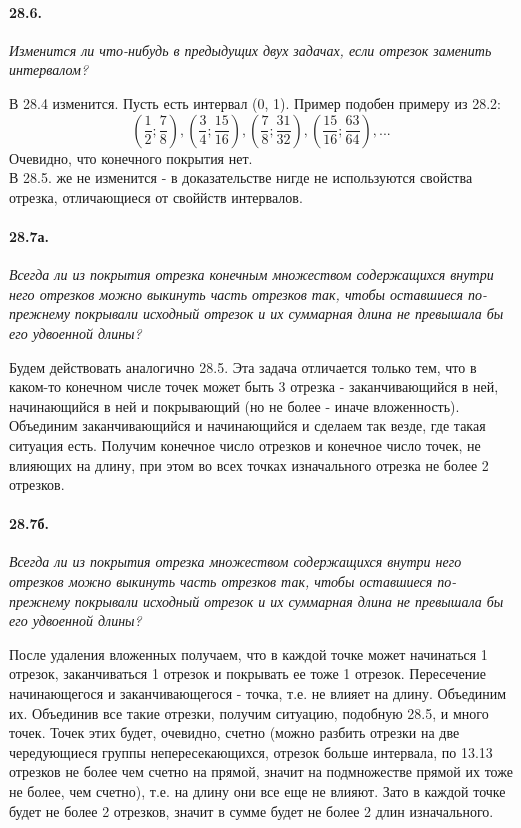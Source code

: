 \documentclass{book}
\begin{document}
\paragraph{28.6.}
\textit{Изменится ли что-нибудь в предыдущих двух задачах, если отрезок заменить
интервалом?}

В 28.4 изменится. Пусть есть интервал (0, 1). Пример подобен примеру из 28.2:
\[(\frac{1}{2}; \frac{7}{8}), (\frac{3}{4}; \frac{15}{16}), (\frac{7}{8}; \frac{31}{32}), (\frac{15}{16}; \frac{63}{64}) , ...\] Очевидно, что конечного покрытия нет. \\
В 28.5. же не изменится - в доказательстве нигде не используются свойства отрезка, отличающиеся от своййств интервалов.

\paragraph{28.7а.}
\textit{Всегда ли из покрытия отрезка конечным множеством содержащихся внутри него отрезков можно выкинуть часть отрезков так, чтобы оставшиеся по-прежнему покрывали исходный отрезок и их суммарная длина не превышала бы его удвоенной длины?}

Будем действовать аналогично 28.5. Эта задача отличается только тем, что в каком-то конечном числе точек может быть 3 отрезка - заканчивающийся в ней, начинающийся в ней и покрывающий (но не более - иначе вложенность). Объединим заканчивающийся и начинающийся и сделаем так везде, где такая ситуация есть. Получим конечное число отрезков и конечное число точек, не влияющих на длину, при этом во всех точках изначального отрезка не более 2 отрезков. 

\paragraph{28.7б.}
\textit{Всегда ли из покрытия отрезка множеством содержащихся внутри него отрезков можно выкинуть часть отрезков так, чтобы оставшиеся по-прежнему покрывали исходный отрезок и их суммарная длина не превышала бы его удвоенной длины?}

После удаления вложенных получаем, что в каждой точке может начинаться 1 отрезок, заканчиваться 1 отрезок и покрывать ее тоже 1 отрезок. Пересечение начинающегося и заканчивающегося - точка, т.е. не влияет на длину. Объединим их. Объединив все такие отрезки, получим ситуацию, подобную 28.5, и много точек. Точек этих будет, очевидно, счетно (можно разбить отрезки на две чередующиеся группы непересекающихся, отрезок больше интервала, по 13.13 отрезков не более чем счетно на прямой, значит на подмножестве прямой их тоже не более, чем счетно), т.е. на длину они все еще не влияют. Зато в каждой точке будет не более 2 отрезков, значит в сумме будет не более 2 длин изначального.
\end{document}
